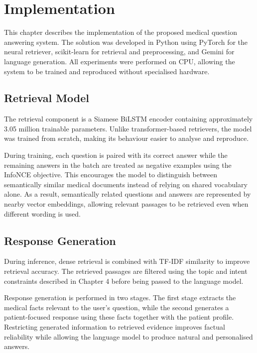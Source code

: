 \section{Implementation}
\label{sec:Implementation}

This chapter describes the implementation of the proposed medical question answering system. The solution was developed in Python using PyTorch for the neural retriever, scikit-learn for retrieval and preprocessing, and Gemini for language generation. All experiments were performed on CPU, allowing the system to be trained and reproduced without specialised hardware.

\subsection{Retrieval Model}

The retrieval component is a Siamese BiLSTM encoder containing approximately 3.05 million trainable parameters. Unlike transformer-based retrievers, the model was trained from scratch, making its behaviour easier to analyse and reproduce.

During training, each question is paired with its correct answer while the remaining answers in the batch are treated as negative examples using the InfoNCE objective. This encourages the model to distinguish between semantically similar medical documents instead of relying on shared vocabulary alone. As a result, semantically related questions and answers are represented by nearby vector embeddings, allowing relevant passages to be retrieved even when different wording is used.

\subsection{Response Generation}

During inference, dense retrieval is combined with TF-IDF similarity to improve retrieval accuracy. The retrieved passages are filtered using the topic and intent constraints described in Chapter 4 before being passed to the language model.

Response generation is performed in two stages. The first stage extracts the medical facts relevant to the user's question, while the second generates a patient-focused response using these facts together with the patient profile. Restricting generated information to retrieved evidence improves factual reliability while allowing the language model to produce natural and personalised answers.

